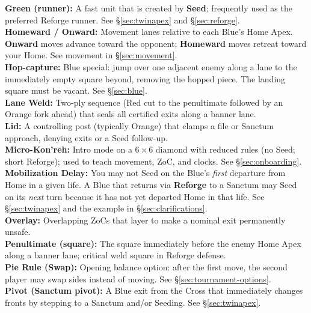 \documentclass[11pt]{article}
\begin{document}
\textbf{Green (runner):} A fast unit that is created by \textbf{Seed}; frequently used as the preferred Reforge runner. See \S\ref{sec:twinapex} and \S\ref{sec:reforge}.\\

\textbf{Homeward / Onward:} Movement lanes relative to each Blue’s Home Apex. \textbf{Onward} moves advance toward the opponent; \textbf{Homeward} moves retreat toward your Home. See movement in \S\ref{sec:movement}.\\

\textbf{Hop-capture:} Blue special: jump over one adjacent enemy along a lane to the immediately empty square beyond, removing the hopped piece. The landing square must be vacant. See \S\ref{sec:blue}.\\

\textbf{Lane Weld:} Two-ply sequence (Red cut to the penultimate followed by an Orange fork ahead) that seals all certified exits along a banner lane.\\

\textbf{Lid:} A controlling post (typically Orange) that clamps a file or Sanctum approach, denying exits or a Seed follow-up.\\

\textbf{Micro-Kon'reh:} Intro mode on a 6\,$\times$\,6 diamond with reduced rules (no Seed; short Reforge); used to teach movement, ZoC, and clocks. See \S\ref{sec:onboarding}.\\

\textbf{Mobilization Delay:} You may not Seed on the Blue’s \emph{first} departure from Home in a given life. A Blue that returns via \textbf{Reforge} to a Sanctum may Seed on its \emph{next} turn because it has not yet departed Home in that life. See \S\ref{sec:twinapex} and the example in \S\ref{sec:clarifications}.\\

\textbf{Overlay:} Overlapping ZoCs that layer to make a nominal exit permanently unsafe.\\

\textbf{Penultimate (square):} The square immediately before the enemy Home Apex along a banner lane; critical weld square in Reforge defense.\\

\textbf{Pie Rule (Swap):} Opening balance option: after the first move, the second player may swap sides instead of moving. See \S\ref{sec:tournament-options}.\\

\textbf{Pivot (Sanctum pivot):} A Blue exit from the Cross that immediately changes fronts by stepping to a Sanctum and/or Seeding. See \S\ref{sec:twinapex}.\\
\end{document}
